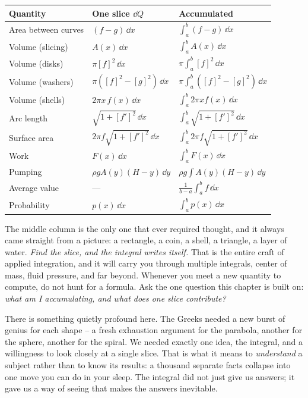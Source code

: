 \begin{center}
\begin{tabular}{@{}lll@{}}
\toprule
\textbf{Quantity} & \textbf{One slice $\dd Q$} & \textbf{Accumulated} \\
\midrule
Area between curves & $(f-g)\,\dd x$ & $\int_a^b (f-g)\,\dd x$ \\
Volume (slicing) & $A(x)\,\dd x$ & $\int_a^b A(x)\,\dd x$ \\
Volume (disks) & $\pi[f]^2\,\dd x$ & $\pi\int_a^b [f]^2\,\dd x$ \\
Volume (washers) & $\pi([f]^2-[g]^2)\,\dd x$ & $\pi\int_a^b([f]^2-[g]^2)\,\dd x$ \\
Volume (shells) & $2\pi x\,f(x)\,\dd x$ & $\int_a^b 2\pi x f(x)\,\dd x$ \\
Arc length & $\sqrt{1+[f']^2}\,\dd x$ & $\int_a^b\sqrt{1+[f']^2}\,\dd x$ \\
Surface area & $2\pi f\sqrt{1+[f']^2}\,\dd x$ & $\int_a^b 2\pi f\sqrt{1+[f']^2}\,\dd x$ \\
Work & $F(x)\,\dd x$ & $\int_a^b F(x)\,\dd x$ \\
Pumping & $\rho g A(y)(H-y)\,\dd y$ & $\rho g\int A(y)(H-y)\,\dd y$ \\
Average value & --- & $\frac{1}{b-a}\int_a^b f\,\dd x$ \\
Probability & $p(x)\,\dd x$ & $\int_a^b p(x)\,\dd x$ \\
\bottomrule
\end{tabular}
\end{center}

The middle column is the only one that ever required thought, and it always came
straight from a picture: a rectangle, a coin, a shell, a triangle, a layer of
water. \emph{Find the slice, and the integral writes itself.} That is the entire
craft of applied integration, and it will carry you through multiple integrals,
center of mass, fluid pressure, and far beyond. Whenever you meet a new quantity to
compute, do not hunt for a formula. Ask the one question this chapter is built on:
\emph{what am I accumulating, and what does one slice contribute?}

\begin{aestheticbox}
There is something quietly profound here. The Greeks needed a new burst of genius
for each shape -- a fresh exhaustion argument for the parabola, another for the
sphere, another for the spiral. We needed exactly one idea, the integral, and a
willingness to look closely at a single slice. That is what it means to
\emph{understand} a subject rather than to know its results: a thousand separate
facts collapse into one move you can do in your sleep. The integral did not just
give us answers; it gave us a way of seeing that makes the answers inevitable.
\end{aestheticbox}

